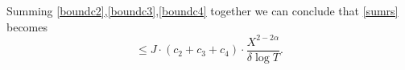 \documentclass[reqno]{amsart}
\numberwithin{equation}{section}
\theoremstyle{remark}
\begin{document}
Summing \eqref{boundc2},\eqref{boundc3},\eqref{boundc4} together we can conclude that \eqref{sumrs} becomes
\begin{equation*}
\le  J\cdot (c_2+c_3+c_4)\cdot \frac{X^{2-2\alpha}}{\delta\log T}.
\end{equation*}

\end{document}
